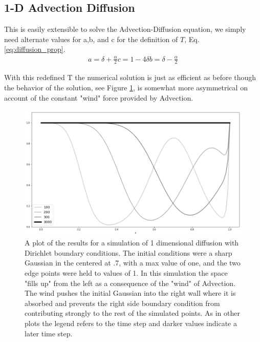 \documentclass[]{article}
\begin{document}
\subsection{1-D Advection Diffusion}
This is easily extensible to solve the Advection-Diffusion equation, we simply need alternate values for a,b, and c for the definition of $T$, Eq. \ref{eq:diffusion_prop}.
\begin{align}
a = \delta + \frac{\alpha}{2}
c = 1 - 4\delta
b = \delta - \frac{\alpha}{2}
\end{align}

With this redefined T the numerical solution is just as efficient as before though the behavior of the solution, see Figure \ref{fig:1D_AD}, is somewhat more asymmetrical on account of the constant "wind" force provided by Advection.
\begin{figure}
	\includegraphics[width=\linewidth]{figures/1D_AD.png}%
	\caption{A plot of the results for a simulation of 1 dimensional diffusion with Dirichlet boundary conditions. The initial conditions were a sharp Gaussian in the centered at .7, with a max value of one, and the two edge points were held to values of 1. In this simulation the space "fills up" from the left as a consequence of the "wind" of Advection. The wind pushes the initial Gaussian into the right wall where it is absorbed and prevents the right side boundary condition from contributing strongly to the rest of the simulated points. As in other plots the legend refers to the time step and darker values indicate a later time step. }
	\label{fig:1D_AD}
\end{figure}
\end{document}
